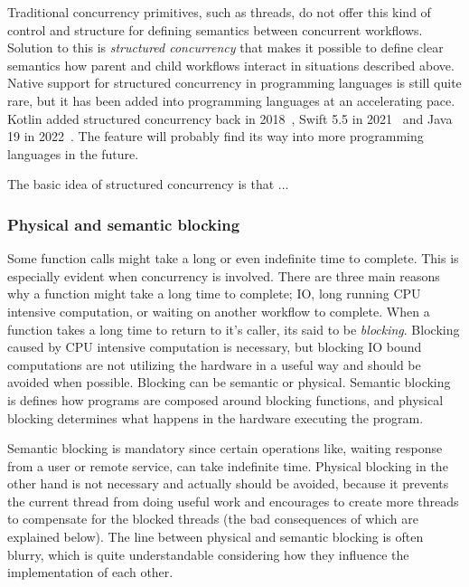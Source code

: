 Traditional concurrency primitives, such as threads, do not offer this kind of control and structure for defining semantics between concurrent workflows. Solution to this is \textit{structured concurrency} that makes it possible to define clear semantics how parent and child workflows interact in situations described above. Native support for structured concurrency in programming languages is still quite rare, but it has been added into programming languages at an accelerating pace. Kotlin added structured concurrency back in 2018~\cite{kotlin-sc}, Swift 5.5 in 2021~\cite{swift-sc} and Java 19 in 2022~\cite{java-sc}. The feature will probably find its way into more programming languages in the future.

The basic idea of structured concurrency is that ... 


\subsubsection{Physical and semantic blocking}
Some function calls might take a long or even indefinite time to complete. This is especially evident when concurrency is involved. There are three main reasons why a function might take a long time to complete; IO, long running CPU intensive computation, or waiting on another workflow to complete. When a function takes a long time to return to it's caller, its said to be \textit{blocking}. Blocking caused by CPU intensive computation is necessary, but blocking IO bound computations are not utilizing the hardware in a useful way and should be avoided when possible. Blocking can be semantic or physical. Semantic blocking is defines how programs are composed around blocking functions, and physical blocking determines what happens in the hardware executing the program.

Semantic blocking is mandatory since certain operations like, waiting response from a user or remote service, can take indefinite time. Physical blocking in the other hand is not necessary and actually should be avoided, because it prevents the current thread from doing useful work and encourages to create more threads to compensate for the blocked threads (the bad consequences of which are explained below). The line between physical and semantic blocking is often blurry, which is quite understandable considering how they influence the implementation of each other.


